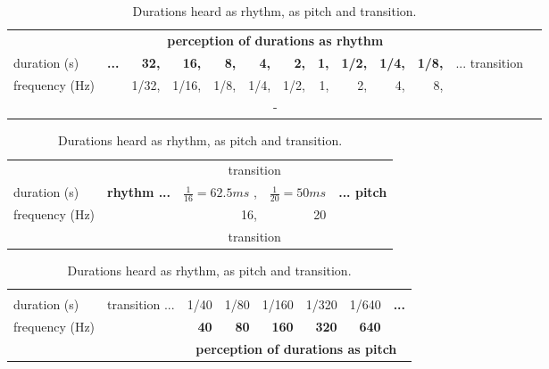 \begin{table}[htp!]
\caption{Durations heard as rhythm, as pitch and transition.}
\begin{tabular}{  l | r r r r   r r r    r r r || r r  } \hline
& \multicolumn{10}{c}{\bf perception of durations as rhythm} & \multicolumn{2}{c}{}  \\
	duration (s) & \multirow{2}{*}{\bf ...}     & {\bf 32,}     & {\bf 16,}   & {\bf 8,}  & {\bf 4,}   & {\bf 2,}   & {\bf 1,}   & {\bf 1/2,} & {\bf 1/4,} & {\bf 1/8,} & \multirow{2}{*}{ ... transition } & \\
frequency (Hz) & & {\color{gray} 1/32,}   & {\color{gray} 1/16,} & {\color{gray} 1/8,} & {\color{gray} 1/4,} & {\color{gray} 1/2,} &  {\color{gray} 1,}  & {\color{gray} 2,}   & {\color{gray} 4,}   & {\color{gray} 8,} & & \\
& \multicolumn{10}{c}{ - } & \multicolumn{2}{c}{} \\ \hline
\end{tabular}
\vspace{.2cm}

	\begin{tabular}{  l | p{1.7cm}  || r r || r } \hline
& \multicolumn{1}{c}{} & \multicolumn{2}{c}{transition} &  \\
duration (s) & \multirow{2}{*}{\bf rhythm ...} & $\frac{1}{16}=62.5ms$ , & $\frac{1}{20}=50ms$ & \multirow{2}{*}{\bf ... pitch} \\
frequency (Hz) & & 16, & 20 &  \\
& \multicolumn{1}{c}{} & \multicolumn{2}{c}{transition} & \\ \hline
\end{tabular}
\hspace{3.36cm}
\vspace{.2cm}

	\begin{tabular}{  l | p{1.7cm} || r r r r r r }\hline
& \multicolumn{1}{c}{} &  \\
	duration (s) & \multirow{2}{*}{transition ...} & {\color{gray} 1/40} & {\color{gray} 1/80  } & {\color{gray} 1/160 } & {\color{gray} 1/320 } & {\color{gray} 1/640 } & \multirow{2}{*}{\bf ... } \\
frequency (Hz) & & {\bf 40}   & {\bf 80}   & {\bf 160}   & {\bf 320}   & {\bf 640}   & \\
& \multicolumn{1}{c}{} & \multicolumn{6}{c}{\bf perception of durations as pitch} \\ \hline
\end{tabular}
\hspace{2.70cm}
\label{tab:duracoes}
\end{table}

